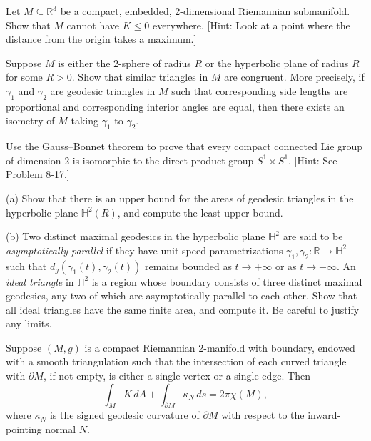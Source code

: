 \begin{exercise}
\label{prob:embedded-submanifold-positive-curvature}
Let $M \subseteq \mathbb{R}^3$ be a compact, embedded, 2-dimensional Riemannian submanifold. Show that $M$ cannot have $K \leq 0$ everywhere. [Hint: Look at a point where the distance from the origin takes a maximum.]
\end{exercise}

\begin{exercise}
\label{prob:similar-triangles-congruent}
Suppose $M$ is either the 2-sphere of radius $R$ or the hyperbolic plane of
radius $R$ for some $R > 0$. Show that similar triangles in $M$ are congruent.
More precisely, if $\gamma_1$ and $\gamma_2$ are geodesic triangles in $M$ such that corresponding side lengths are proportional and corresponding interior angles are
equal, then there exists an isometry of $M$ taking $\gamma_1$ to $\gamma_2$.
\end{exercise}

\begin{exercise}
\label{prob:compact-lie-groups-isomorphic}
Use the Gauss--Bonnet theorem to prove that every compact connected Lie
group of dimension 2 is isomorphic to the direct product group $S^1 \times S^1$.
[Hint: See Problem 8-17.]
\end{exercise}

\begin{exercise}
\label{prob:ideal-triangles-hyperbolic}
(a) Show that there is an upper bound for the areas of geodesic triangles in
the hyperbolic plane $\mathbb{H}^2(R)$, and compute the least upper bound.

(b) Two distinct maximal geodesics in the hyperbolic plane $\mathbb{H}^2$ are said to be
\textit{asymptotically parallel} if they have unit-speed parametrizations $\gamma_1, \gamma_2:
\mathbb{R} \to \mathbb{H}^2$ such that $d_g(\gamma_1(t), \gamma_2(t))$ remains bounded as $t \to +\infty$ or as
$t \to -\infty$. An \textit{ideal triangle} in $\mathbb{H}^2$ is a region whose boundary consists of
three distinct maximal geodesics, any two of which are asymptotically parallel to each other. Show that all ideal triangles have the same finite
area, and compute it. Be careful to justify any limits.
\end{exercise}

\begin{exercise}
\label{prob:gauss-bonnet-with-boundary}
Suppose $(M, g)$ is a compact Riemannian 2-manifold with boundary, endowed
with a smooth triangulation such that the intersection of each curved triangle
with $\partial M$, if not empty, is either a single vertex or a single edge. Then
\[
\int_M K \, dA + \int_{\partial M} \kappa_N \, ds = 2\pi \chi(M),
\]
where $\kappa_N$ is the signed geodesic curvature of $\partial M$ with respect to the inward-pointing normal $N$.
\end{exercise}

